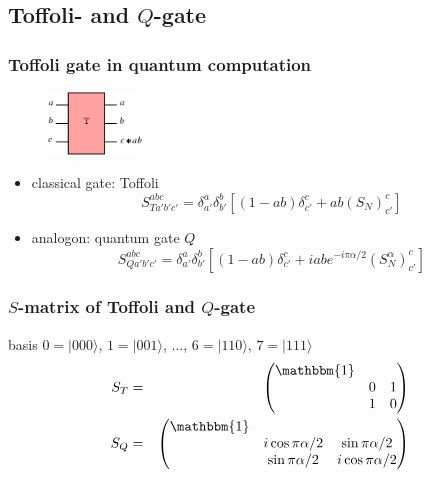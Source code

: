 \documentclass{beamer}
\begin{document}
\subsection{Toffoli- and $Q$-gate}
\begin{frame}
	\frametitle{Toffoli gate in quantum computation}
	\begin{figure}
		\centering
		\includegraphics[width=2.5cm]{fig/toffoli.png}
	\end{figure}
	\begin{itemize}
		\item<1-> classical gate: Toffoli
		\begin{equation}
			S_{Ta'b'c'}^{abc}=\delta_{a'}^a\delta_{b'}^b[(1-ab)\delta_{c'}^c+ab(S_N)_{c'}^c]
		\end{equation}
		\item<2-> analogon: quantum gate $Q$
		\begin{equation}
			S_{Qa'b'c'}^{abc}=\delta_{a'}^a\delta_{b'}^b\left[(1-ab)\delta_{c'}^c+iab e^{-i\pi\alpha/2}(S_N^\alpha)_{c'}^c\right]
		\end{equation}
	\end{itemize}
\end{frame}
\begin{frame}
	\frametitle{$S$-matrix of Toffoli and $Q$-gate}
	basis $0=|000\rangle$, $1=|001\rangle$, $\ldots$, $6=|110\rangle$, $7=|111\rangle$
	\begin{eqnarray*}
		S_T&=&\begin{pmatrix}
				\mathbbm{1}&&\\
				&0&1\\
				&1&0
		      \end{pmatrix}\\
		S_Q&=&\begin{pmatrix}
		       \mathbbm{1}&&\\
				&i\cos\pi\alpha/2&\sin\pi\alpha/2\\
				&\sin\pi\alpha/2&i\cos\pi\alpha/2
		      \end{pmatrix}
	\end{eqnarray*}
\end{frame}
%
\end{document}
